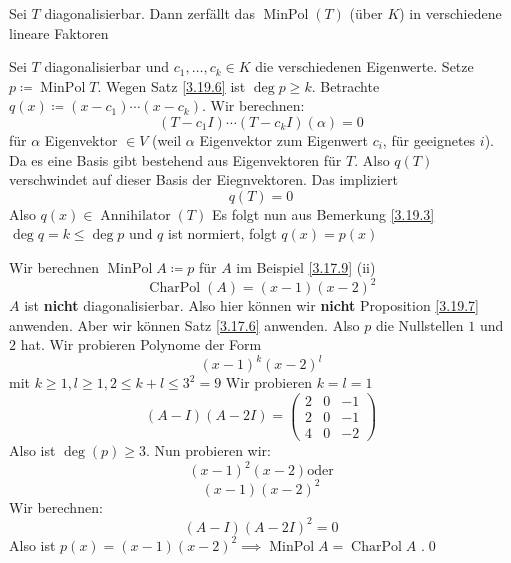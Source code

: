 \begin{subproposition}
	Sei $ T $ diagonalisierbar. Dann zerfällt das $ \operatorname{Min Pol}(T) $ (über $ K $) in verschiedene lineare Faktoren
\end{subproposition}
\begin{subproof*}
	Sei $ T $ diagonalisierbar und $ c_1, \dotsc, c_k \in K $ die verschiedenen Eigenwerte.
	Setze $ p \coloneqq \operatorname{Min Pol} T $.
	Wegen Satz \ref{3.19.6} ist $ \deg p \geq k $.
	Betrachte $ q(x) \coloneqq \left( x - c_1 \right) \dotsb \left( x - c_k \right)  $.
	Wir berechnen:
	\[
		\left( T - c_1 I \right) \dotsb \left( T - c_k I \right) (\alpha) = 0
	\]
	für $ \alpha $ Eigenvektor $ \in V $ (weil $ \alpha $ Eigenvektor zum Eigenwert $ c_i $, für geeignetes $ i $).
	Da es eine Basis gibt bestehend aus Eigenvektoren für $ T $.
	Also $ q(T) $ verschwindet auf dieser Basis der Eiegnvektoren.
	Das impliziert
	\[
		q(T) = 0
	\]
	Also $ q(x) \in \operatorname{Annihilator}(T) $ 
	Es folgt nun aus Bemerkung \ref{3.19.3} $ \deg q = k \leq  \deg p $ und $ q $ ist normiert, folgt $ q(x) = p(x) $
\end{subproof*}

\begin{subexample}
	Wir berechnen $ \operatorname{Min Pol} A \coloneqq p $ für $ A $ im Beispiel \ref{3.17.9} (ii)
	\[
		\operatorname{Char Pol}(A) = (x - 1)(x - 2)^2
	\]
	$ A $ ist \textbf{nicht} diagonalisierbar.
	Also hier können wir \textbf{nicht} Proposition \ref{3.19.7} anwenden.
	Aber wir können Satz \ref{3.17.6} anwenden.
	Also $ p $ die Nullstellen $ 1 $ und $ 2 $ hat.
	Wir probieren Polynome der Form
	\[
		\left( x - 1 \right) ^{k} \left( x - 2 \right) ^{l} 
	\]
	mit $ k \geq 1, l \geq 1, 2 \leq k + l \leq 3^2 = 9 $ 
	Wir probieren $ k = l = 1 $ 
	\[
		\left( A - I \right) \left( A - 2I \right) = \begin{pmatrix} 2 & 0 & -1 \\ 2 & 0 & -1 \\ 4 & 0 & - 2 \end{pmatrix} 
	\]
	Also ist $ \deg (p) \geq 3 $.
	Nun probieren wir:
	\[
		\left( x - 1 \right) ^2 \left( x - 2 \right) \text{oder} 
	\]
	\[
		\left( x - 1 \right) \left( x - 2 \right) ^2
	\]
	Wir berechnen:
	\[
		\left( A - I \right) \left( A - 2I \right) ^2 = 0
	\]
	Also ist $ p(x) = \left( x - 1 \right) \left( x - 2 \right) ^2 \implies \operatorname{Min Pol} A = \operatorname{Char Pol} A$ .\qed
\end{subexample}

